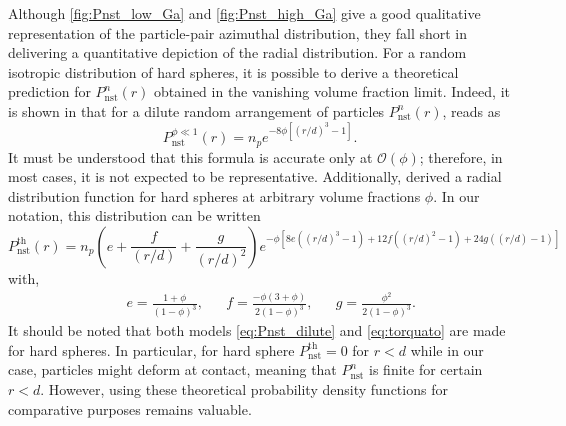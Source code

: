Although \ref{fig:Pnst_low_Ga} and \ref{fig:Pnst_high_Ga} give a good qualitative representation of the particle-pair azimuthal distribution, they fall short in delivering a quantitative depiction of the radial distribution.
For a random isotropic distribution of hard spheres, it is possible to derive a theoretical prediction for $P_\text{nst}^n(r)$ obtained in the vanishing volume fraction limit. 
Indeed, it is shown in \citet{zhang2021ensemble} that for a dilute random arrangement of particles $P_\text{nst}^n(r)$, reads as
\begin{equation}
    P_\text{nst}^{\phi \ll 1}(r) = n_p e^{- 8\phi\left[(r/d)^3-1\right]}.
    \label{eq:Pnst_dilute}
\end{equation}
It must be understood that this formula is accurate only at $\mathcal{O}(\phi)$; therefore, in most cases, it is not expected to be representative.
Additionally, \citet{torquato1990nearest} derived a radial distribution function for hard spheres at arbitrary volume fractions $\phi$. In our notation, this distribution can be written
\begin{equation}
    P_\text{nst}^\text{th}(r) = 
        n_p\left(e+\frac{f}{(r/d)} +\frac{g}{(r/d)^2}\right)
    e^{-\phi\left[8e\left((r/d)^3-1\right)+12 f\left((r/d)^2-1\right)+24g\left((r/d)-1\right)\right]}
    \label{eq:torquato}
\end{equation}
with, 
\begin{align*}
    && e= \frac{1+\phi}{(1-\phi)^3},
    && f= \frac{-\phi (3+\phi)}{2(1-\phi)^3},
    && g= \frac{\phi^2}{2(1-\phi)^3}.
\end{align*}
It should be noted that both models \eqref{eq:Pnst_dilute} and \eqref{eq:torquato} are made for hard spheres. %
In particular, for hard sphere $P_\text{nst}^\text{th} = 0$ for $r<d$ while in our case, particles might deform at contact, meaning that $P_\text{nst}^n$ is finite for certain $r<d$. 
However, using these theoretical probability density functions for comparative purposes remains valuable. 

